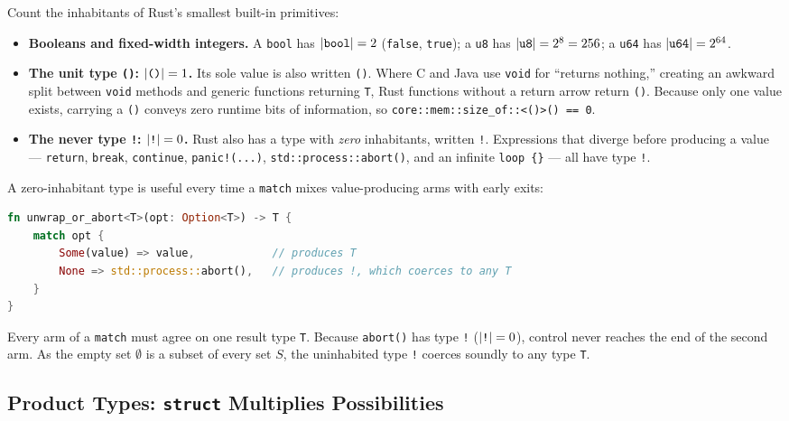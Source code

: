 Count the inhabitants of Rust's smallest built-in primitives:
\begin{itemize}
  \item \textbf{Booleans and fixed-width integers.} A \texttt{bool} has $\lvert\texttt{bool}\rvert = 2$ (\texttt{false}, \texttt{true}); a \texttt{u8} has $\lvert\texttt{u8}\rvert = 2^8 = 256$; a \texttt{u64} has $\lvert\texttt{u64}\rvert = 2^{64}$.
  \item \textbf{The unit type \texttt{()}: $\lvert\texttt{()}\rvert = 1$.} Its sole value is also written \texttt{()}. Where C and Java use \texttt{void} for ``returns nothing,'' creating an awkward split between \texttt{void} methods and generic functions returning \texttt{T}, Rust functions without a return arrow return \texttt{()}. Because only one value exists, carrying a \texttt{()} conveys zero runtime bits of information, so \texttt{core::mem::size\_of::<()>() == 0}.
  \item \textbf{The never type \texttt{!}: $\lvert\texttt{!}\rvert = 0$.} Rust also has a type with \emph{zero} inhabitants, written \texttt{!}. Expressions that diverge before producing a value --- \texttt{return}, \texttt{break}, \texttt{continue}, \texttt{panic!(...)}, \texttt{std::process::abort()}, and an infinite \texttt{loop \{\}} --- all have type \texttt{!}.
\end{itemize}

A zero-inhabitant type is useful every time a \texttt{match} mixes value-producing arms with early exits:

\begin{lstlisting}[language=Rust]
fn unwrap_or_abort<T>(opt: Option<T>) -> T {
    match opt {
        Some(value) => value,            // produces T
        None => std::process::abort(),   // produces !, which coerces to any T
    }
}
\end{lstlisting}

Every arm of a \texttt{match} must agree on one result type \texttt{T}. Because \texttt{abort()} has type \texttt{!} ($\lvert\texttt{!}\rvert = 0$), control never reaches the end of the second arm. As the empty set $\emptyset$ is a subset of every set $S$, the uninhabited type \texttt{!} coerces soundly to any type \texttt{T}.

\subsection{Product Types: \texttt{struct} Multiplies Possibilities}
\label{ch05:product-types}

